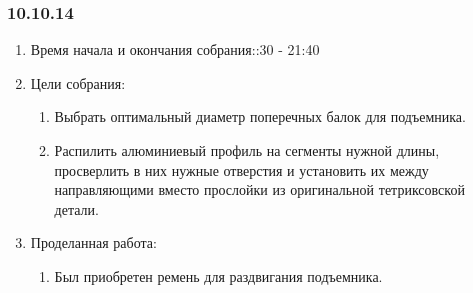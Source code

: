 
\subsubsection{10.10.14}

\begin{enumerate}
	\item Время начала и окончания собрания::30 - 21:40
	\item Цели собрания:\newline
	\begin{enumerate}
	  \item Выбрать оптимальный диаметр поперечных балок для подъемника.\newline
	  
	  \item Распилить алюминиевый профиль на сегменты нужной длины, просверлить в них нужные отверстия и установить их между направляющими вместо прослойки из оригинальной тетриксовской детали.\newline
	  
    \end{enumerate}
	\item Проделанная работа:\newline
	\begin{enumerate}
	  \item Был приобретен ремень для раздвигания подъемника.\newline
	  

\end{enumerate}
\end{enumerate}
